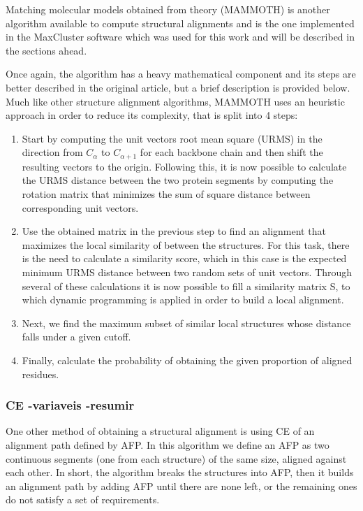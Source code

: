 Matching molecular models obtained from theory (MAMMOTH) \cite{ortiz2002mammoth} is another algorithm available to compute structural alignments and is the one implemented in the MaxCluster software which was used for this work and will be described in the sections ahead.

Once again, the algorithm has a heavy mathematical component and its steps are better described in the original article, but a brief description is provided below. Much like other structure alignment algorithms, MAMMOTH uses an heuristic approach in order to reduce its complexity, that is split into 4 steps:

\begin{enumerate}
	\item Start by computing the unit vectors root mean square (URMS) in the direction from $C_{\alpha}$ to $C_{\alpha+1}$ for each backbone chain and then shift the resulting vectors to the origin. Following this, it is now possible to calculate the URMS distance between the two protein segments by computing the rotation matrix that minimizes the sum of square distance between corresponding unit vectors.
	\item Use the obtained matrix in the previous step to find an alignment that maximizes the local similarity of between the structures. For this task, there is the need to calculate a similarity score, which in this case is the expected minimum URMS distance between two random sets of unit vectors. Through several of these calculations it is now possible to fill a similarity matrix S, to which dynamic programming is applied in order to build a local alignment.
	\item Next, we find the maximum subset of similar local structures whose distance falls under a given cutoff.
	\item Finally, calculate the probability of obtaining the given proportion of aligned residues.	
\end{enumerate}

\subsubsection{CE -variaveis -resumir}
One other method of obtaining a structural alignment is using \gls{CE} of an alignment path defined by \gls{AFP}. In this algorithm we define an AFP as two continuous segments (one from each structure) of the same size, aligned against each other. In short, the algorithm breaks the structures into AFP, then it builds an alignment path by adding AFP until there are none left, or the remaining ones do not satisfy a set of requirements.

